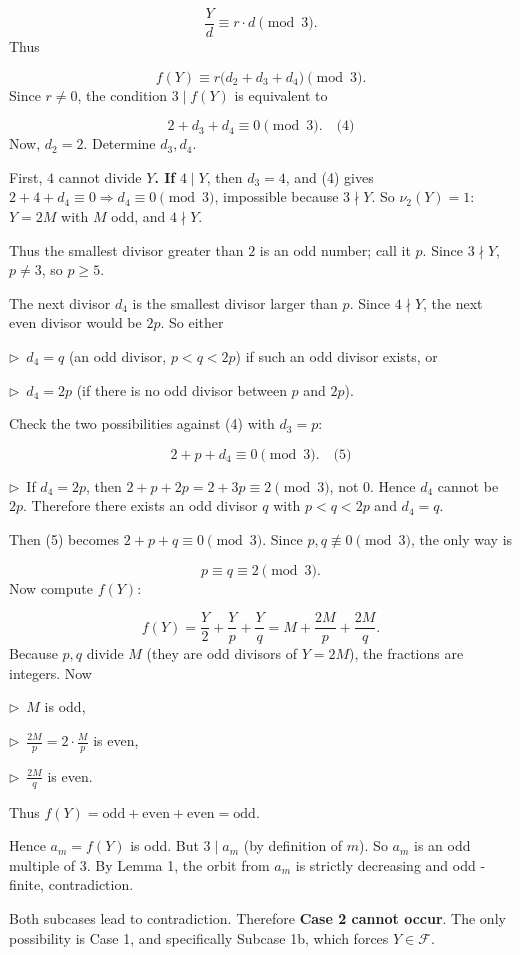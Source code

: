 \documentclass{llmxive}
\providecommand{\compactbullet}[1]{\par\noindent$\triangleright$~#1\par}
\begin{document}
\[
\frac{Y}{d}\equiv r\cdot d\pmod3.
\]
Thus\par
\[
f(Y)\equiv r\bigl(d_2+d_3+d_4\bigr)\pmod3.
\]
Since \(r\neq0\), the condition \(3\mid f(Y)\) is equivalent to\par
\[
2+d_3+d_4\equiv0\pmod3. \quad\text{(4)}
\]
Now, \(d_2=2\). Determine \(d_3,d_4\).\par
First, \textbf{}\(4\) cannot divide \(Y\)\textbf{. If }\(4\mid Y\), then \(d_3=4\), and (4) gives \(2+4+d_4\equiv0\Rightarrow d_4\equiv0\pmod3\), impossible because \(3\nmid Y\). So \(\nu_2(Y)=1\): \(Y=2M\) with \(M\) odd, and \(4\nmid Y\).\par
Thus the smallest divisor greater than \(2\) is an odd number; call it \(p\). Since \(3\nmid Y\), \(p\neq3\), so \(p\ge5\).\par
The next divisor \(d_4\) is the smallest divisor larger than \(p\). Since \(4\nmid Y\), the next even divisor would be \(2p\). So either\par
\compactbullet{\(d_4=q\) (an odd divisor, \(p<q<2p\)) if such an odd divisor exists, or}
\compactbullet{\(d_4=2p\) (if there is no odd divisor between \(p\) and \(2p\)).}
Check the two possibilities against (4) with \(d_3=p\):\par
\[
2+p+d_4\equiv0\pmod3. \quad\text{(5)}
\]
\compactbullet{If \(d_4=2p\), then \(2+p+2p=2+3p\equiv2\pmod3\), not \(0\). Hence \(d_4\) cannot be \(2p\). Therefore there exists an odd divisor \(q\) with \(p<q<2p\) and \(d_4=q\).}
Then (5) becomes \(2+p+q\equiv0\pmod3\). Since \(p,q\not\equiv0\pmod3\), the only way is\par
\[
p\equiv q\equiv2\pmod3.
\]
Now compute \(f(Y)\):\par
\[
f(Y)=\frac{Y}{2}+\frac{Y}{p}+\frac{Y}{q}=M+\frac{2M}{p}+\frac{2M}{q}.
\]
Because \(p,q\) divide \(M\) (they are odd divisors of \(Y=2M\)), the fractions are integers. Now\par
\compactbullet{\(M\) is odd,}
\compactbullet{\(\frac{2M}{p}=2\cdot\frac{M}{p}\) is even,}
\compactbullet{\(\frac{2M}{q}\) is even.}
Thus \(f(Y)=\text{odd}+\text{even}+\text{even}=\text{odd}\).\par
Hence \(a_m=f(Y)\) is odd. But \(3\mid a_m\) (by definition of \(m\)). So \(a_m\) is an odd multiple of \(3\). By Lemma 1, the orbit from \(a_m\) is strictly decreasing and odd - finite, contradiction.\par
Both subcases lead to contradiction. Therefore \textbf{Case 2 cannot occur}. The only possibility is Case 1, and specifically Subcase 1b, which forces \(Y\in\mathcal{F}\).\par
\end{document}
